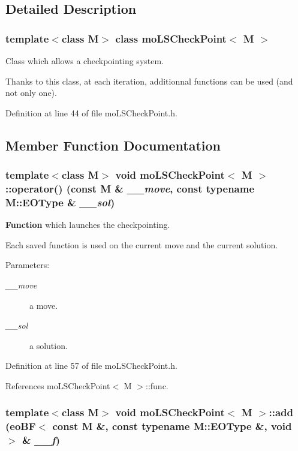 \subsection{Detailed Description}
\subsubsection*{template$<$class M$>$ class moLSCheckPoint$<$ M $>$}

Class which allows a checkpointing system. 

Thanks to this class, at each iteration, additionnal functions can be used (and not only one). 



Definition at line 44 of file moLSCheckPoint.h.

\subsection{Member Function Documentation}
\subsubsection{\setlength{\rightskip}{0pt plus 5cm}template$<$class M$>$ void {\bf moLSCheckPoint}$<$ M $>$::operator() (const M \& {\em \_\-\_\-move}, const typename M::EOType \& {\em \_\-\_\-sol})\hspace{0.3cm}{\tt  [inline]}}\label{classmo_l_s_check_point_2f9c1250279e3f49ec77a66c10029f1e}


{\bf Function} which launches the checkpointing. 

Each saved function is used on the current move and the current solution.

\begin{Desc}
\item[Parameters:]
\begin{description}
\item[{\em \_\-\_\-move}]a move. \item[{\em \_\-\_\-sol}]a solution. \end{description}
\end{Desc}


Definition at line 57 of file moLSCheckPoint.h.

References moLSCheckPoint$<$ M $>$::func.
\subsubsection{\setlength{\rightskip}{0pt plus 5cm}template$<$class M$>$ void {\bf moLSCheckPoint}$<$ M $>$::add ({\bf eoBF}$<$ const M \&, const typename M::EOType \&, void $>$ \& {\em \_\-\_\-f})\hspace{0.3cm}{\tt  [inline]}}\label{classmo_l_s_check_point_66be5fe2944bcdd752f1e58105e969a6}


